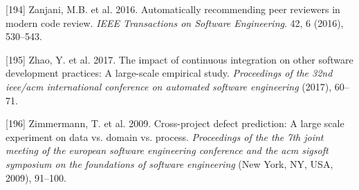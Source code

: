 \documentclass[]{book}
\begin{document}
\hypertarget{ref-zanjani2016automatically}{}
{[}194{]} Zanjani, M.B. et al. 2016. Automatically recommending peer
reviewers in modern code review. \emph{IEEE Transactions on Software
Engineering}. 42, 6 (2016), 530--543.

\hypertarget{ref-zhao2017impact}{}
{[}195{]} Zhao, Y. et al. 2017. The impact of continuous integration on
other software development practices: A large-scale empirical study.
\emph{Proceedings of the 32nd ieee/acm international conference on
automated software engineering} (2017), 60--71.

\hypertarget{ref-zimmermann2009}{}
{[}196{]} Zimmermann, T. et al. 2009. Cross-project defect prediction: A
large scale experiment on data vs. domain vs. process. \emph{Proceedings
of the the 7th joint meeting of the european software engineering
conference and the acm sigsoft symposium on the foundations of software
engineering} (New York, NY, USA, 2009), 91--100.
\end{document}
